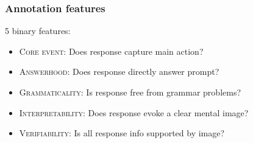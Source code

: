 \documentclass[handout,xcolor={dvipsnames}]{beamer}
\newcommand{\feat}[1]{\textsc{#1}}
\begin{document}
\begin{frame}
\frametitle{Annotation features}
5 binary features:
\begin{itemize}
\pause
\vspace{.8em}
\item \feat{Core event}: \pause Does response capture main action?
\pause
\vspace{.8em}
\item \feat{Answerhood}: \pause Does response directly answer prompt?
\pause
\vspace{.8em}
\item \feat{Grammaticality}: \pause Is response free from grammar problems?
\pause
\vspace{.8em}
\item \feat{Interpretability}: \pause Does response evoke a clear mental image?
\pause
\vspace{.8em}
\item \feat{Verifiability}: \pause Is all response info supported by image?
\end{itemize}


\end{frame}
\end{document}
